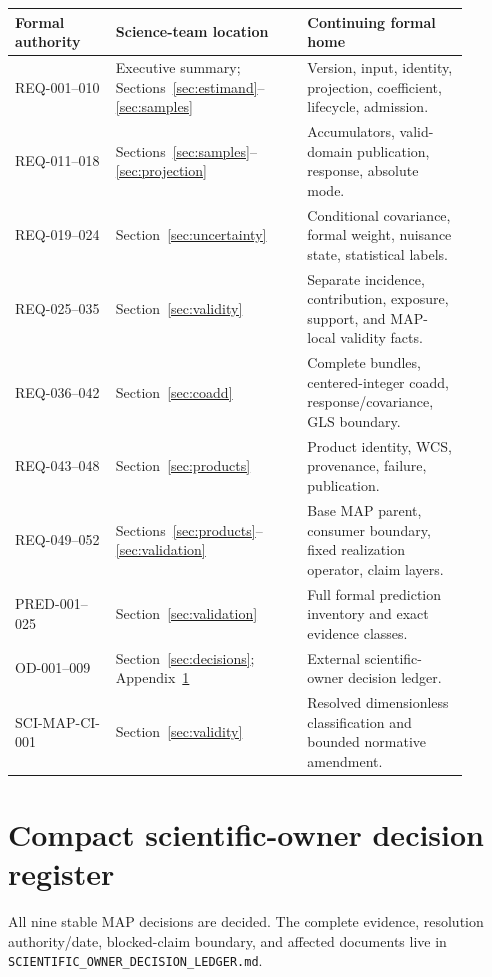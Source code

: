 \documentclass[10pt]{article}
\newcommand{\code}[1]{\nolinkurl{#1}}
\begin{document}
\begin{longtable}{L{0.20\linewidth}L{0.38\linewidth}L{0.32\linewidth}}
\toprule Formal authority & Science-team location & Continuing formal home \\
\midrule
REQ-001--010 & Executive summary; Sections~\ref{sec:estimand}--\ref{sec:samples} & Version, input, identity, projection, coefficient, lifecycle, admission.\\
REQ-011--018 & Sections~\ref{sec:samples}--\ref{sec:projection} & Accumulators, valid-domain publication, response, absolute mode.\\
REQ-019--024 & Section~\ref{sec:uncertainty} & Conditional covariance, formal weight, nuisance state, statistical labels.\\
REQ-025--035 & Section~\ref{sec:validity} & Separate incidence, contribution, exposure, support, and MAP-local validity facts.\\
REQ-036--042 & Section~\ref{sec:coadd} & Complete bundles, centered-integer coadd, response/covariance, GLS boundary.\\
REQ-043--048 & Section~\ref{sec:products} & Product identity, WCS, provenance, failure, publication.\\
REQ-049--052 & Sections~\ref{sec:products}--\ref{sec:validation} & Base MAP parent, consumer boundary, fixed realization operator, claim layers.\\
PRED-001--025 & Section~\ref{sec:validation} & Full formal prediction inventory and exact evidence classes.\\
OD-001--009 & Section~\ref{sec:decisions}; Appendix~\ref{app:decisions} & External scientific-owner decision ledger.\\
SCI-MAP-CI-001 & Section~\ref{sec:validity} & Resolved dimensionless classification and bounded normative amendment.\\
\bottomrule
\end{longtable}

\clearpage
\section{Compact scientific-owner decision register}\label{app:decisions}
All nine stable MAP decisions are decided. The complete evidence, resolution
authority/date, blocked-claim boundary, and affected documents live in
\code{SCIENTIFIC_OWNER_DECISION_LEDGER.md}.



\clearpage
\end{document}
